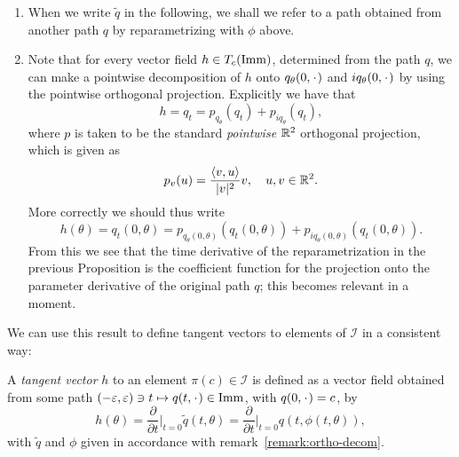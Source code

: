 \begin{remark}
  \label{remark:ortho-decom}
  \begin{enumerate}
  \item  When we write $\tilde{q}$ in the following, we shall we refer to a path obtained from another path $q$ by reparametrizing with $\phi$ above.
  \item Note that for every vector field $h \in T_c(\mathop{}\!\mathrm{Imm})$, determined from the path $q$, we can make a pointwise decomposition of $h$ onto $q_{\theta}(0, \blank)$ and $iq_{\theta}(0, \blank)$ by using the pointwise orthogonal projection. Explicitly we have that
  \begin{equation*}
    h = q_t = p_{q_{\theta}}(q_{t}) + p_{iq_{\theta}}(q_{t}),
  \end{equation*}
  where $p$ is taken to be the standard \textit{pointwise} $\mathbb{R}^2$ orthogonal projection, which is given as
  \begin{equation*}
    p_v(u) = \frac{\langle v, u \rangle}{|v|^2} v, \quad u, v \in \mathbb{R}^2.
  \end{equation*}
  More correctly we should thus write
  \begin{equation*}
    h(\theta) = q_t(0,\theta) = p_{q_{\theta}(0,\theta)}(q_{t}(0,\theta)) +
    p_{iq_{\theta}(0,\theta)}(q_{t}(0,\theta)).
  \end{equation*}
  From this we see that the time derivative of the reparametrization in the previous Proposition is the coefficient function for the projection onto the parameter derivative of the original path $q$; this becomes relevant in a moment.
\end{enumerate}
\end{remark}

We can use this result to define tangent vectors to elements of $\mathcal{I}$ in
a consistent way:

\begin{definition}
  \label{def:tang-quotient}
  A \textit{tangent vector} $h$ to an element $\pi(c) \in \mathcal{I}$ is defined as a vector field obtained from some path $(-\epsilon, \epsilon) \ni t \mapsto q(t, \blank) \in \I$, with $q(0,\blank) = c$, by
  \begin{equation}
    \label{eq:tang-quotient}
    h(\theta) = \frac{\partial }{\partial t} \bigg\vert_{t=0} \tilde{q}(t,\theta)
    = \frac{\partial }{\partial t} \bigg\vert_{t=0} q(t, \phi(t,\theta)),
  \end{equation}
  with $\tilde{q}$ and $\phi$ given in accordance with remark~\ref{remark:ortho-decom}.
\end{definition}

